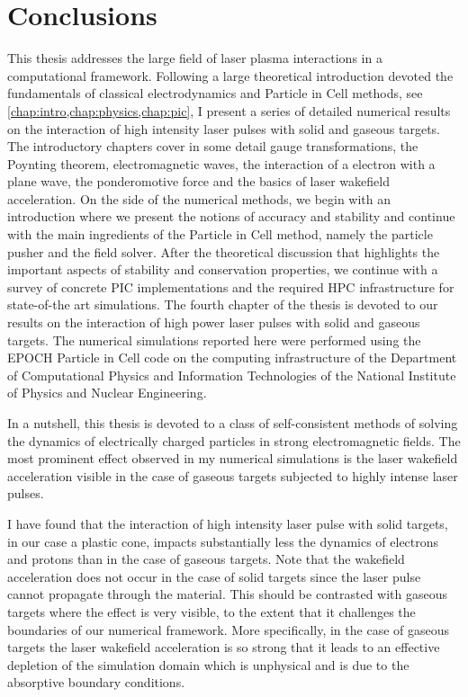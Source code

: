 \documentclass[12pt, class=report, crop=false]{standalone}
\begin{document}
\chapter{Conclusions}%
\label{chap:conclusions}

This thesis addresses the large field of laser plasma interactions in a
computational framework. Following a large theoretical introduction devoted
the fundamentals of classical electrodynamics and Particle in Cell methods, see
\cref{chap:intro,chap:physics,chap:pic}, I present a series of detailed numerical
results on the interaction of high intensity laser pulses with solid and
gaseous targets. The introductory chapters cover in some detail gauge
transformations, the Poynting theorem, electromagnetic waves, the interaction
of a electron with a plane wave, the ponderomotive force and the basics of
laser wakefield acceleration. On the side of the numerical methods, we begin with
an introduction where we present the notions of accuracy and stability and
continue with the main ingredients of the Particle in Cell method, namely the
particle pusher and the field solver. After the theoretical discussion that
highlights the important aspects of stability and conservation properties, we
continue with a survey of concrete PIC implementations and the required HPC
infrastructure for state-of-the art simulations. The fourth chapter of the thesis
is devoted to our results on the interaction of high power laser pulses with
solid and gaseous targets. The numerical simulations reported here were performed
using the EPOCH Particle in Cell code on the computing infrastructure of the
Department of Computational Physics and Information
Technologies of the National Institute of Physics and Nuclear Engineering.

In a nutshell, this thesis is devoted to a class of self-consistent methods of
solving the dynamics of electrically charged particles in strong electromagnetic
fields. The most prominent effect observed in my numerical simulations is the
laser wakefield acceleration visible in the case of gaseous targets subjected
to highly intense laser pulses.

I have found that the interaction of high intensity laser pulse with solid targets,
in our case a plastic cone, impacts substantially less the dynamics of
electrons and protons than in the case of gaseous targets. Note that the
wakefield acceleration does not occur in the case of solid targets since the
laser pulse cannot propagate through the material. This should be contrasted
with gaseous targets where the effect is very visible, to the extent that
it challenges the boundaries of our numerical framework. More specifically,
in the case of gaseous targets the laser wakefield acceleration is so
strong that it leads to an effective depletion of the simulation domain
which is unphysical and is due to the absorptive boundary conditions.
\end{document}
